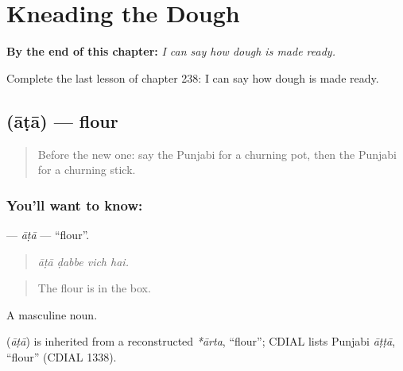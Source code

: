 
\chapter{Kneading the Dough}
\label{ch:pa-a2-kneading-the-dough}

\begin{chapteropening}
\textbf{By the end of this chapter:} \emph{I can say how dough is made ready.}

Complete the last lesson of chapter 238: I can say how dough is made ready.
\end{chapteropening}

\section[\texorpdfstring{\pa{ਆਟਾ} (āṭā)}{ਆਟਾ (āṭā)}]{ (āṭā) — flour}

\label{lesson:PA-C238-ata}



\begin{quote}
Before the new one: say the Punjabi for a churning pot, then the Punjabi for a churning stick.
\end{quote}

\subsection*{You'll want to know: }
\textbf{} — \emph{āṭā} — \textquotedblleft{}flour\textquotedblright{}.

\begin{quote}
   
\end{quote}

\begin{quote}
\emph{āṭā ḍabbe vich hai.}
\end{quote}

\begin{quote}
The flour is in the box.
\end{quote}

A masculine noun.

\begin{cousinweb}
\textbf{} (\emph{āṭā}) is inherited from a reconstructed \emph{*ārta}, \textquotedblleft{}flour\textquotedblright{}; CDIAL lists Punjabi \emph{āṭṭā}, \textquotedblleft{}flour\textquotedblright{} (CDIAL 1338).
\end{cousinweb}

